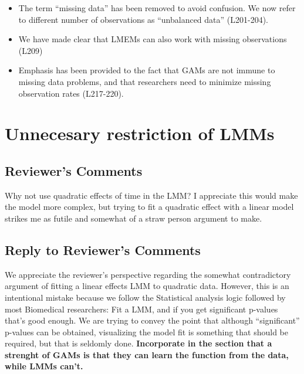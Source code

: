 \documentclass[
]{article}
\begin{document}
\begin{itemize}
\item
  The term ``missing data'' has been removed to avoid confusion. We now refer to different number of observations as ``unbalanced data'' (L201-204).
\item
  We have made clear that LMEMs can also work with missing observations (L209)
\item
  Emphasis has been provided to the fact that GAMs are not immune to missing data problems, and that researchers need to minimize missing observation rates (L217-220).
\end{itemize}

\hypertarget{unnecesary-restriction-of-lmms}{%
\section{Unnecesary restriction of LMMs}\label{unnecesary-restriction-of-lmms}}

\hypertarget{reviewers-comments-1}{%
\subsection{Reviewer's Comments}\label{reviewers-comments-1}}

Why not use quadratic effects of time in the LMM? I appreciate this would make the model more complex, but trying to fit a quadratic effect with a linear model strikes me as futile and somewhat of a straw person argument to make.

\hypertarget{section-2}{%
\subsection{\texorpdfstring{\textcolor{reviewersblue} {Reply to Reviewer's Comments}}{}}\label{section-2}}

We appreciate the reviewer's perspective regarding the somewhat contradictory argument of fitting a linear effects LMM to quadratic data. However, this is an intentional mistake because we follow the Statistical analysis logic followed by most Biomedical researchers: Fit a LMM, and if you get significant p-values that's good enough. We are trying to convey the point that although ``significant'' p-values can be obtained, visualizing the model fit is something that should be required, but that is seldomly done. \textbf{Incorporate in the section that a strenght of GAMs is that they can learn the function from the data, while LMMs can't.}
\end{document}

